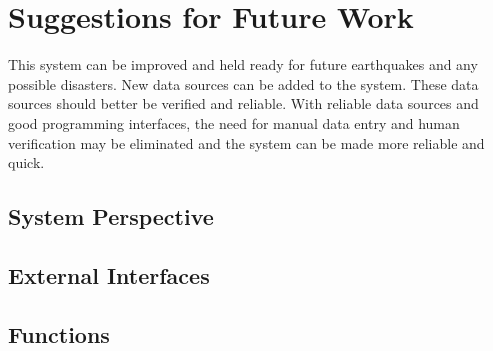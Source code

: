 \documentclass[a4paper]{article}
\begin{document}
    \section{Suggestions for Future Work}


    This system can be improved and held ready for future earthquakes and any possible disasters.
    New data sources can be added to the system. These data sources should better be verified and reliable. With reliable data sources and good programming interfaces, the need for manual data entry and human verification may be eliminated and
    the system can be made more reliable and quick.
    
        \subsection{System Perspective}
    

        \subsection{External Interfaces}


        \subsection{Functions}
\end{document}

